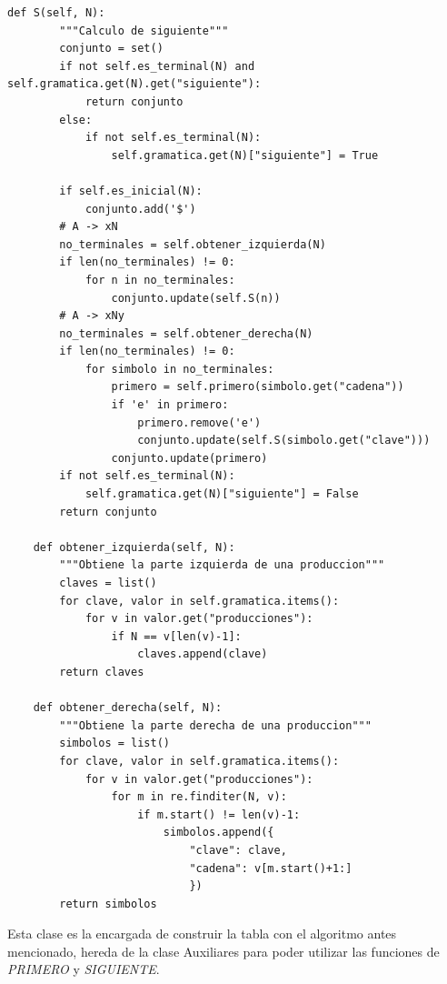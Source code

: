 \documentclass[12pt, titlepage]{article}
\begin{document}
\begin{lstlisting}[title=Archivo: auxiliares.py]
    def S(self, N):
        """Calculo de siguiente"""
        conjunto = set()
        if not self.es_terminal(N) and self.gramatica.get(N).get("siguiente"):
            return conjunto
        else:
            if not self.es_terminal(N):
                self.gramatica.get(N)["siguiente"] = True

        if self.es_inicial(N):
            conjunto.add('$')
        # A -> xN
        no_terminales = self.obtener_izquierda(N)
        if len(no_terminales) != 0:
            for n in no_terminales:
                conjunto.update(self.S(n))
        # A -> xNy
        no_terminales = self.obtener_derecha(N)
        if len(no_terminales) != 0:
            for simbolo in no_terminales:
                primero = self.primero(simbolo.get("cadena"))
                if 'e' in primero:
                    primero.remove('e')
                    conjunto.update(self.S(simbolo.get("clave")))
                conjunto.update(primero)
        if not self.es_terminal(N):
            self.gramatica.get(N)["siguiente"] = False
        return conjunto

    def obtener_izquierda(self, N):
        """Obtiene la parte izquierda de una produccion"""
        claves = list()
        for clave, valor in self.gramatica.items():
            for v in valor.get("producciones"):
                if N == v[len(v)-1]:
                    claves.append(clave)
        return claves

    def obtener_derecha(self, N):
        """Obtiene la parte derecha de una produccion"""
        simbolos = list()
        for clave, valor in self.gramatica.items():
            for v in valor.get("producciones"):
                for m in re.finditer(N, v):
                    if m.start() != len(v)-1:
                        simbolos.append({
                            "clave": clave,
                            "cadena": v[m.start()+1:]
                            })
        return simbolos

    \end{lstlisting}
    Esta clase es la encargada de construir la tabla con el algoritmo antes 
mencionado, hereda de la clase Auxiliares para poder utilizar las funciones de 
\emph{PRIMERO} y \emph{SIGUIENTE}.
\end{document}
